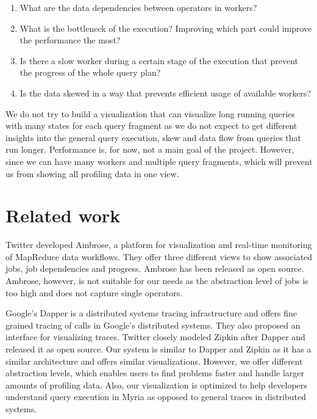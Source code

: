 \documentclass[11pt]{scrartcl}
\begin{document}
\begin{enumerate}
  \item What are the data dependencies between operators in workers?
  \item What is the bottleneck of the execution? Improving which part could improve the performance the most?
  \item Is there a slow worker during a certain stage of the execution that prevent the progress of the whole query plan?
  \item Is the data skewed in a way that prevents efficient usage of available workers?

\end{enumerate}

We do not try to build a visualization that can visualize long running queries with many states for each query fragment as we do not expect to get different insights into the general query execution, skew and data flow from queries that run longer. Performance is, for now, not a main goal of the project. However, since we can have many workers and multiple query fragments, which will prevent us from showing all profiling data in one view.


\section{Related work}

Twitter developed Ambrose\cite{ambrose}, a platform for visualization and real-time monitoring of MapReduce data workflows. They offer three different views to show associated jobs, job dependencies and progress. Ambrose has been released as open source. Ambrose, however, is not suitable for our needs as the abstraction level of jobs is too high and does not capture single operators.

Google's Dapper\cite{sigelman2010dapper} is a distributed systems tracing infrastructure and offers fine grained tracing of calls in Google's distributed systems. They also proposed an interface for visualizing traces. Twitter closely modeled Zipkin\cite{zipkin} after Dapper and released it as open source. Our system is similar to Dapper and Zipkin as it has a similar architecture and offers similar visualizations. However, we offer different abstraction levels, which enables users to find problems faster and handle larger amounts of profiling data. Also, our visualization is optimized to help developers understand query execution in Myria as opposed to general traces in distributed systems.
\end{document}

